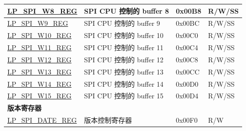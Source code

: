 \begin{longtable}{ | p{6cm} | p{6.6cm} | p{1.3cm} | p{1.7cm} | }
\hyperref[regdesc:LPSPIW8REG]{LP\_SPI\_W8\_REG} & SPI CPU 控制的 buffer 8 & 0x00B8 & R/W/SS \\ \hline
\hyperref[regdesc:LPSPIW9REG]{LP\_SPI\_W9\_REG} & SPI CPU 控制的 buffer 9 & 0x00BC & R/W/SS \\ \hline
\hyperref[regdesc:LPSPIW10REG]{LP\_SPI\_W10\_REG} & SPI CPU 控制的 buffer 10 & 0x00C0 & R/W/SS \\ \hline
\hyperref[regdesc:LPSPIW11REG]{LP\_SPI\_W11\_REG} & SPI CPU 控制的 buffer 11 & 0x00C4 & R/W/SS \\ \hline
\hyperref[regdesc:LPSPIW12REG]{LP\_SPI\_W12\_REG} & SPI CPU 控制的 buffer 12 & 0x00C8 & R/W/SS \\ \hline
\hyperref[regdesc:LPSPIW13REG]{LP\_SPI\_W13\_REG} & SPI CPU 控制的 buffer 13 & 0x00CC & R/W/SS \\ \hline
\hyperref[regdesc:LPSPIW14REG]{LP\_SPI\_W14\_REG} & SPI CPU 控制的 buffer 14 & 0x00D0 & R/W/SS \\ \hline
\hyperref[regdesc:LPSPIW15REG]{LP\_SPI\_W15\_REG} & SPI CPU 控制的 buffer 15 & 0x00D4 & R/W/SS \\ \hline
\multicolumn{4}{|l|}{\textbf{版本寄存器}} \\ \hline
\hyperref[regdesc:LPSPIDATEREG]{LP\_SPI\_DATE\_REG} & 版本控制寄存器 & 0x00F0 & R/W \\ \hline
\end{longtable}
